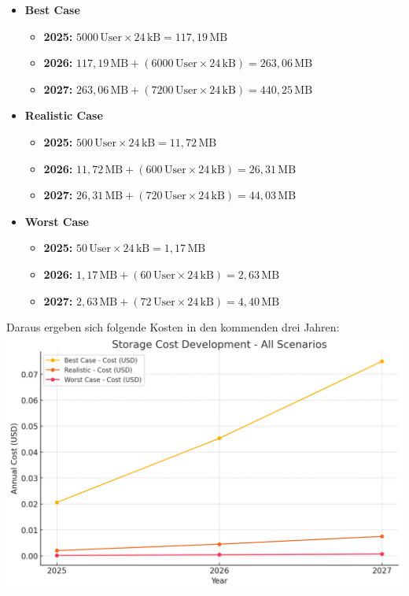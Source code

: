 \begin{itemize}
    \item \textbf{Best Case}
    \begin{itemize}
        \item \textbf{2025:} \(5000 \, \text{User} \times 24 \, \text{kB} = 117,19 \, \text{MB}\)
        \item \textbf{2026:} \(117,19 \, \text{MB} + (6000 \, \text{User} \times 24 \, \text{kB}) = 263,06 \, \text{MB}\)
        \item \textbf{2027:} \(263,06 \, \text{MB} + (7200 \, \text{User} \times 24 \, \text{kB}) = 440,25 \, \text{MB}\)
    \end{itemize}

    \item \textbf{Realistic Case}
    \begin{itemize}
        \item \textbf{2025:} \(500 \, \text{User} \times 24 \, \text{kB} = 11,72 \, \text{MB}\)
        \item \textbf{2026:} \(11,72 \, \text{MB} + (600 \, \text{User} \times 24 \, \text{kB}) = 26,31 \, \text{MB}\)
        \item \textbf{2027:} \(26,31 \, \text{MB} + (720 \, \text{User} \times 24 \, \text{kB}) = 44,03 \, \text{MB}\)
    \end{itemize}

    \item \textbf{Worst Case}
    \begin{itemize}
        \item \textbf{2025:} \(50 \, \text{User} \times 24 \, \text{kB} = 1,17 \, \text{MB}\)
        \item \textbf{2026:} \(1,17 \, \text{MB} + (60 \, \text{User} \times 24 \, \text{kB}) = 2,63 \, \text{MB}\)
        \item \textbf{2027:} \(2,63 \, \text{MB} + (72 \, \text{User} \times 24 \, \text{kB}) = 4,40 \, \text{MB}\)
    \end{itemize}
\end{itemize}

Daraus ergeben sich folgende Kosten in den kommenden drei Jahren:
\includegraphics{abbildungen/Kosten_Speicher_Text}


